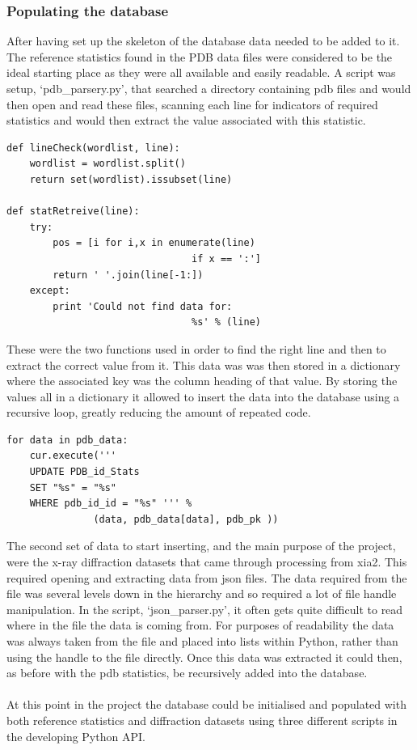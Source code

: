 \documentclass[11pt, a4paper]{article}
\begin{document}
\begin{multicols}{2}
\subsubsection{Populating the database}
After having set up the skeleton of the database data needed to be added to it. The reference statistics found in the PDB data files were considered to be the ideal starting place as they were all available and easily readable. A script was setup, `pdb\_parsery.py', that searched a directory containing pdb files and would then open and read these files, scanning each line for indicators of required statistics and would then extract the value associated with this statistic.
\begin{verbatim}
def lineCheck(wordlist, line):
    wordlist = wordlist.split()
    return set(wordlist).issubset(line)

def statRetreive(line):
    try:
        pos = [i for i,x in enumerate(line) 
                                if x == ':']
        return ' '.join(line[-1:])
    except:
        print 'Could not find data for: 
                                %s' % (line)
\end{verbatim}
These were the two functions used in order to find the right line and then to extract the correct value from it. This data was was then stored in a dictionary where the associated key was the column heading of that value. By storing the values all in a dictionary it allowed to insert the data into the database using a recursive loop, greatly reducing the amount of repeated code.
\begin{verbatim}
for data in pdb_data:
    cur.execute('''
    UPDATE PDB_id_Stats 
    SET "%s" = "%s"
    WHERE pdb_id_id = "%s" ''' % 
               (data, pdb_data[data], pdb_pk ))
\end{verbatim}
The second set of data to start inserting, and the main purpose of the project, were the x-ray diffraction datasets that came through processing from xia2. This required opening and extracting data from json files. The data required from the file was several levels down in the hierarchy and so required a lot of file handle manipulation. In the script, `json\_parser.py', it often gets quite difficult to read where in the file the data is coming from. For purposes of readability the data was always taken from the file and placed into lists within Python, rather than using the handle to the file directly. Once this data was extracted it could then, as before with the pdb statistics, be recursively added into the database.\\
\\
At this point in the project the database could be initialised and populated with both reference statistics and diffraction datasets using three different scripts in the developing Python API.

\end{multicols}
\end{document}
